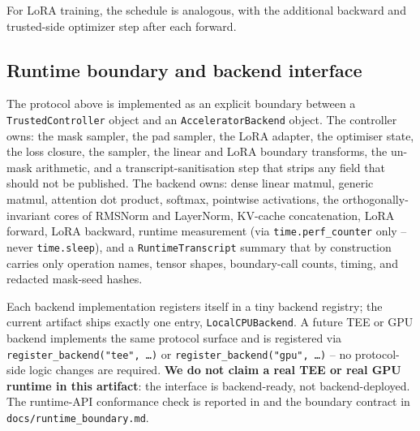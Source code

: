 For LoRA training, the schedule is analogous, with the additional backward and trusted-side optimizer step after each forward.

\subsection{Runtime boundary and backend interface}
\label{sec:design:backend}
The protocol above is implemented as an explicit boundary between a \texttt{TrustedController} object and an \texttt{AcceleratorBackend} object. The controller owns: the mask sampler, the pad sampler, the LoRA adapter, the optimiser state, the loss closure, the sampler, the linear and LoRA boundary transforms, the un-mask arithmetic, and a transcript-sanitisation step that strips any field that should not be published. The backend owns: dense linear matmul, generic matmul, attention dot product, softmax, pointwise activations, the orthogonally-invariant cores of RMSNorm and LayerNorm, KV-cache concatenation, LoRA forward, LoRA backward, runtime measurement (via \texttt{time.perf\_counter} only -- never \texttt{time.sleep}), and a \texttt{RuntimeTranscript} summary that by construction carries only operation names, tensor shapes, boundary-call counts, timing, and redacted mask-seed hashes.

Each backend implementation registers itself in a tiny backend registry; the current artifact ships exactly one entry, \texttt{LocalCPUBackend}. A future TEE or GPU backend implements the same protocol surface and is registered via \texttt{register\_backend("tee", \ldots)} or \texttt{register\_backend("gpu", \ldots)} -- no protocol-side logic changes are required. \textbf{We do not claim a real TEE or real GPU runtime in this artifact}: the interface is backend-ready, not backend-deployed. The runtime-API conformance check is reported in  and the boundary contract in \texttt{docs/runtime\_boundary.md}.
